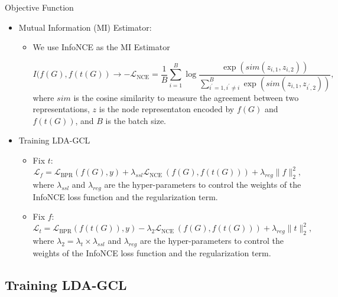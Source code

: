 \documentclass[t]{beamer}
\begin{document}
\begin{frame}[allowframebreaks]{Objective Function}
\begin{itemize}
    \item  Mutual Information (MI) Estimator:
    \begin{itemize}
        \item We use InfoNCE as the MI Estimator
        \begin{small}
\begin{equation*}
    I(f(G), f(t(G)) \rightarrow -\mathcal{L}_{\text{NCE}}=\frac{1}{B} \sum_{i=1}^{B} \log \frac{\exp \left(sim\left(z_{i, 1}, z_{i, 2}\right)\right)}{\sum_{i^{\prime}=1, i^{\prime} \neq i}^{B} \exp \left(sim\left(z_{i, 1}, z_{i^{\prime}, 2}\right)\right)},
\end{equation*}
where $sim$ is the cosine similarity to measure the agreement between two representations, $z$ is the node representaton encoded by $f(G)$ and $f(t(G))$, and $B$ is the batch size.
\end{small}
    \end{itemize}
\framebreak
    \item Training LDA-GCL
    \begin{itemize}
        \item Fix $t$:
\begin{equation*}
    \label{eq:fix_t}
   \mathcal{L}_{f} =\mathcal{L}_{\text{BPR}}(f(G), y) +  \lambda_{ssl}\mathcal{L}_{\text{NCE}}\ (f(G), f(t(G))) +  \lambda_{reg} \|f\|^2_{2},
\end{equation*}
where $\lambda_{ssl}$ and $\lambda_{reg}$ are the hyper-parameters to control the weights of the InfoNCE loss function and the regularization term.
        \item Fix  $f$:
\begin{equation*}
   \label{eq:fix_f}
   \mathcal{L}_{t} = \mathcal{L}_{\text{BPR}}(f(t(G)), y) -\lambda_2\mathcal{L}_{\text{NCE}}\ (f(G), f(t(G))) + \lambda_{reg} \|t\|^2_{2},
\end{equation*}
where $\lambda_2 = \lambda_t \times \lambda_{ssl}$ and $\lambda_{reg}$ are the hyper-parameters to control the weights of the InfoNCE loss function and the regularization term.
    \end{itemize}
\end{itemize}

\end{frame}

\subsection{Training LDA-GCL}
\end{document}
